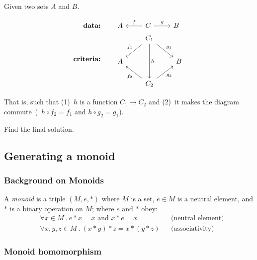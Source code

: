 Given two sets $A$ and $B$.

\begin{align*}
     \textbf{data:}\qquad & \begin{tikzcd}[ampersand replacement=\&]
            A \& C \arrow[l, swap, "f"] \arrow[r, "g"] \& B
        \end{tikzcd} \\
    \textbf{criteria:}\qquad & \begin{tikzcd}[ampersand replacement=\&]
          {} \& C_1 \arrow[dd, "h"] \arrow[ld, swap, "f_1"] \arrow[rd, "g_1"]
          \& {} \\ A \& {} \& B \\
          {} \& C_2 \arrow[lu, "f_2"] \arrow[ru, swap, "g_2"] \& {}
      \end{tikzcd}
\end{align*}



That is, such that (1)~$h$ is a function $C_1 \rightarrow C_2$ and (2)~it
makes the diagram commute~(\ie~$h \circ f_2 = f_1$ and $h \circ g_2 = g_1$).

\begin{exercise}
    Find the final solution. \label{ex:dual}
\end{exercise}


\subsection{Generating a monoid}
\label{section_generate_monoid}

\subsubsection*{Background on Monoids}

A \emph{monoid} is a triple $(M, e, \ast)$ where $M$ is a set, $e \in M$ is a
neutral element, and $\ast$ is a binary operation on $M$; where $e$ and $\ast$
obey:
\begin{align*}
    & \forall x \in M\ .\
    e \ast x = x \text{ and } x \ast e = x && \text{(neutral
    element)} \\
    & \forall x,y,z \in M\ .\
    (x \ast y) \ast z = x \ast (y \ast z) && \text{(associativity)}
\end{align*}

\subsubsection*{Monoid homomorphism}

